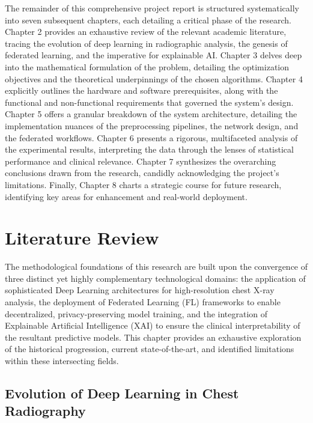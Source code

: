 \documentclass[12pt,a4paper]{report}
\begin{document}
The remainder of this comprehensive project report is structured systematically into seven subsequent chapters, each detailing a critical phase of the research. Chapter 2 provides an exhaustive review of the relevant academic literature, tracing the evolution of deep learning in radiographic analysis, the genesis of federated learning, and the imperative for explainable AI. Chapter 3 delves deep into the mathematical formulation of the problem, detailing the optimization objectives and the theoretical underpinnings of the chosen algorithms. Chapter 4 explicitly outlines the hardware and software prerequisites, along with the functional and non-functional requirements that governed the system's design. Chapter 5 offers a granular breakdown of the system architecture, detailing the implementation nuances of the preprocessing pipelines, the network design, and the federated workflows. Chapter 6 presents a rigorous, multifaceted analysis of the experimental results, interpreting the data through the lenses of statistical performance and clinical relevance. Chapter 7 synthesizes the overarching conclusions drawn from the research, candidly acknowledging the project's limitations. Finally, Chapter 8 charts a strategic course for future research, identifying key areas for enhancement and real-world deployment.

\chapter{Literature Review}

\noindent
The methodological foundations of this research are built upon the convergence of three distinct yet highly complementary technological domains: the application of sophisticated Deep Learning architectures for high-resolution chest X-ray analysis, the deployment of Federated Learning (FL) frameworks to enable decentralized, privacy-preserving model training, and the integration of Explainable Artificial Intelligence (XAI) to ensure the clinical interpretability of the resultant predictive models. This chapter provides an exhaustive exploration of the historical progression, current state-of-the-art, and identified limitations within these intersecting fields.

\section{Evolution of Deep Learning in Chest Radiography}
\end{document}
